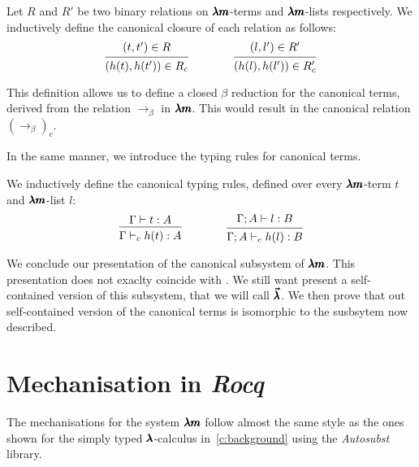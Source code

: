 \begin{definition}
  \label{canonical_closure}
  Let $R$ and $R'$ be two binary relations on $\pmb{\lambda m}$-terms and $\pmb{\lambda m}$-lists respectively.
  We inductively define the canonical closure of each relation as follows:
  \[
    \begin{prooftree}
      \hypo{ (t, t') \in R }
      \infer1{ (h(t), h(t')) \in R_c } 
    \end{prooftree}
    \qquad \qquad
    \begin{prooftree}
      \hypo{ (l, l') \in R' }
      \infer1{ (h(l), h(l')) \in R'_c } 
    \end{prooftree}
  \]
\end{definition}

This definition allows us to define a closed $\beta$ reduction for the canonical terms, derived from the relation $\to_\beta$ in $\pmb{\lambda m}$. This would result in the canonical relation ${(\to_\beta)}_c$. 

In the same manner, we introduce the typing rules for canonical terms.

\begin{definition}
  \label{canonical_typing}
  We inductively define the canonical typing rules, defined over every $\pmb{\lambda m}$-term $t$ and $\pmb{\lambda m}$-list $l$:
  \[
    \begin{prooftree}
      \hypo{ \Gamma \vdash t:A }
      \infer1{ \Gamma \vdash_c h(t):A } 
    \end{prooftree}
    \qquad \qquad
    \begin{prooftree}
      \hypo{ \Gamma ; A \vdash l:B }
      \infer1{ \Gamma ; A \vdash_c h(l):B }.
    \end{prooftree}
  \]
\end{definition}

We conclude our presentation of the canonical subsystem of $\pmb{\lambda m}$.
This presentation does not exaclty coincide with \cite{JCES2002}.
We still want present a self-contained version of this subsystem, that we will call $\pmb{\vec \lambda}$.
We then prove that out self-contained version of the canonical terms is isomorphic to the susbsytem now described.


\section{Mechanisation in \textit{Rocq}}

The mechanisations for the system $\pmb{\lambda m}$ follow almost the same style as the ones shown for the simply typed $\pmb{\lambda}$-calculus in~\cref{c:background} using the \textit{Autosubst} library.

